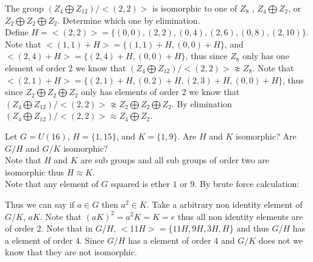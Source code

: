 \documentclass[12pt]{article}
\makeatletter
\theoremstyle{homework}
\newenvironment{exercise}[1]
{\def\@currentlabel{#1}\exercisecore}
{\endexercisecore}
\makeatother
\begin{document}
\begin{exercise}{9.24}
The group $(Z_4 \bigoplus Z_{12} )/<(2, 2)>$ is isomorphic to one of $Z_8$ , $Z_4 \bigoplus Z_2$, or $Z_2 \bigoplus Z_2 \bigoplus Z_2$. Determine which one by elimination.\\
Define $H=<(2,2)>=\{(0,0),(2,2),(0,4),(2,6),(0,8),(2,10)\}$.  Note that $<(1,1)+H>=\{(1,1)+H,(0,0)+H\}$, and $<(2,4)+H>=\{(2,4)+H,(0,0)+H\}$, thus since $Z_8$ only has one element of order 2 we know that $(Z_4 \bigoplus Z_{12} )/<(2, 2)>\not\approx Z_8$.  Note that $<(2,1)+H>=\{(2,1)+H,(0,2)+H,(2,3)+H,(0,0)+H\}$, thus since $Z_2 \bigoplus Z_2 \bigoplus Z_2$ only has elements of order 2 we know that $(Z_4 \bigoplus Z_{12} )/<(2, 2)>\not\approx Z_2 \bigoplus Z_2 \bigoplus Z_2$.  By elimination $(Z_4 \bigoplus Z_{12} )/<(2, 2)>\approx Z_4 \bigoplus Z_2$.
\end{exercise}

\begin{exercise}{9.27}
Let $G = U(16)$, $H = \{1, 15\}$, and $K = \{1, 9\}$. Are $H$ and $K$ isomorphic? Are $G/H$ and $G/K$ isomorphic?\\
Note that $H$ and $K$ are sub groups and all sub groups of order two are isomorphic thus $H\approx K$.\\
Note that any element of $G$ squared is ether $1$ or $9$.  By brute force calculation:
\newpage

Thus we can say if $a\in G$ then $a^2\in K$.  Take a arbitrary non identity element of $G/K$, $aK$.  Note that $(aK)^2=a^2K=K=e$ thus all non identity elements are of order 2.  Note that in $G/H$, $<11H>=\{11H,9H,3H,H\}$ and thus $G/H$ has a element of order 4.  Since $G/H$ has a element of order 4 and $G/K$ does not we know that they are not isomorphic.
\end{exercise}
\end{document}
